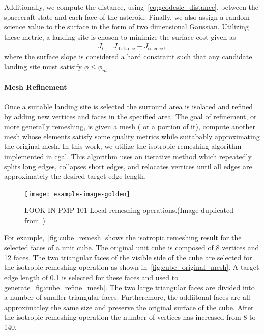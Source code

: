 Additionally, we compute the distance, using~\cref{eq:geodesic_distance}, between the spacecraft state and each face of the asteroid. 
Finally, we also assign a random science value to the surface in the form of two dimensional Gaussian.
Utilizing these metric, a landing site is chosen to minimize the surface cost given as
\begin{align}\label{eq:surface_cost}
    J_l =  J_{\text{distance}} - J_{\text{science}},
\end{align}
where the surface slope is considered a hard constraint such that any candidate landing site must satisify \( \phi \leq \phi_m \).

\paragraph{Mesh Refinement}\label{sec:refinement}
Once a suitable landing site is selected the surround area is isolated and refined by adding new vertices and faces in the specified area.
The goal of refinement, or more generally remeshing, is given a mesh ( or a portion of it), compute another mesh whose elements satisfy some quality metrics while suitabably approximating the original mesh.
In this work, we utilize the isotropic remeshing algorithm implemented in \gls{cgal}.
This algorithm uses an iterative method which repeatedly splits long edges, collapses short edges, and relocates vertices until all edges are approximately the desired target edge length.
\begin{figure}[htbp]
    \centering
    \texttt{[image: example-image-golden]}
    \caption[Isotropic Remeshing]{LOOK IN PMP 101 Local remeshing operations.(Image duplicated from~\cite{botsch2010})\label{fig:isotropic_remeshing}}
\end{figure}
For example,~\cref{fig:cube_remesh} shows the isotropic remeshing result for the selected faces of a unit cube.
The original unit cube is composed of \num{8} vertices and \num{12} faces.
The two triangular faces of the visible side of the cube are selected for the isotropic remeshing operation as shown in~\cref{fig:cube_original_mesh}.
A target edge length of \num{0.1} is selected for these faces and used to generate~\cref{fig:cube_refine_mesh}.
The two large triangular faces are divided into a number of smaller triangular faces.
Furtheremore, the addiitonal faces are all approximatley the same size and preserve the original surface of the cube.
After the isotropic remeshing operation the number of vertices has increased from \num{8} to \num{140}.
